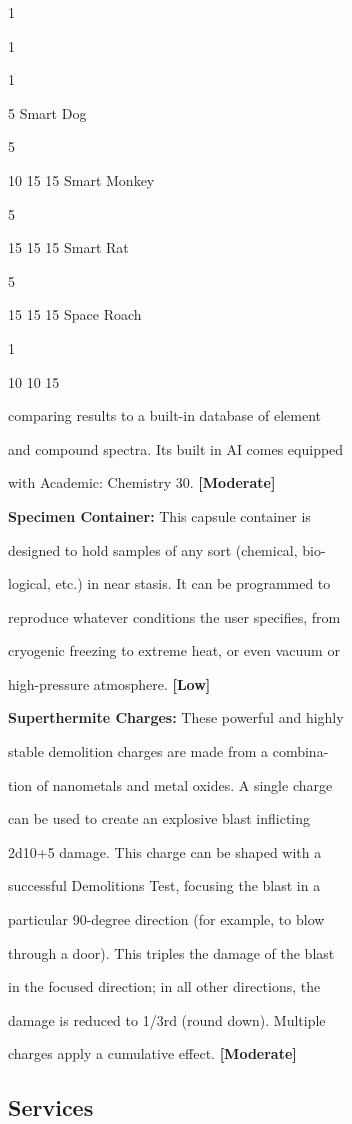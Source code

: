 1

1

1

5
Smart Dog

5

10 15 15
Smart Monkey

5

15 15 15
Smart Rat

5

15 15 15
Space Roach

1

10 10 15

comparing results to a built-in database of element 

and compound spectra. Its built in AI comes equipped 

with Academic: Chemistry 30. \textbf{[Moderate]}

\textbf{Specimen Container:} This capsule container is 

designed to hold samples of any sort (chemical, bio-

logical, etc.) in near stasis. It can be programmed to 

reproduce whatever conditions the user specifies, from 

cryogenic freezing to extreme heat, or even vacuum or 

high-pressure atmosphere. \textbf{[Low]}

\textbf{Superthermite Charges:} These powerful and highly 

stable demolition charges are made from a combina-

tion of nanometals and metal oxides. A single charge 

can be used to create an explosive blast inflicting 

2d10+5 damage. This charge can be shaped with a 

successful Demolitions Test, focusing the blast in a 

particular 90-degree direction (for example, to blow 

through a door). This triples the damage of the blast 

in the focused direction; in all other directions, the 

damage is reduced to 1/3rd (round down). Multiple 

charges apply a cumulative effect. \textbf{[Moderate]}

\subsection{Services}



